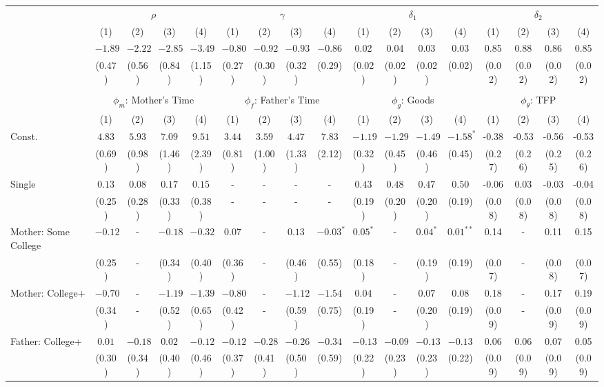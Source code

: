\begin{tabular}{lcccccccccccccccc}\\\toprule
 & \multicolumn{4}{c}{$\rho$} & \multicolumn{4}{c}{$\gamma$} & \multicolumn{4}{c}{$\delta_{1}$} & \multicolumn{4}{c}{$\delta_{2}$} \\
&(1)&(2)&(3)&(4)&(1)&(2)&(3)&(4)&(1)&(2)&(3)&(4)&(1)&(2)&(3)&(4)\\\cmidrule(r){2-5}\cmidrule(r){6-9}\cmidrule(r){10-13}\cmidrule(r){14-17}
&$-1.89$&$-2.22$&$-2.85$&$-3.49$&$-0.80$&$-0.92$&$-0.93$&$-0.86$&0.02&0.04&0.03&0.03&0.85&0.88&0.86&0.85\\
&(0.47)&(0.56)&(0.84)&(1.15)&(0.27)&(0.30)&(0.32)&(0.29)&(0.02)&(0.02)&(0.02)&(0.02)&(0.02)&(0.02)&(0.02)&(0.02)\\
&&&&&&&&&&&&&&&&\\
 & \multicolumn{4}{c}{$\phi_{m}$: Mother's Time} & \multicolumn{4}{c}{$\phi_{f}$: Father's Time} & \multicolumn{4}{c}{$\phi_{g}$: Goods} & \multicolumn{4}{c}{$\phi_{\theta}$: TFP} \\
&(1)&(2)&(3)&(4)&(1)&(2)&(3)&(4)&(1)&(2)&(3)&(4)&(1)&(2)&(3)&(4)\\\cmidrule(r){2-5}\cmidrule(r){6-9}\cmidrule(r){10-13}\cmidrule(r){14-17}
Const.&$4.83$&$5.93$&$7.09$&$9.51$&$3.44$&$3.59$&$4.47$&$7.83$&$-1.19$&$-1.29$&$-1.49$&$-1.58^{*}$&-0.38&-0.53&-0.56&-0.53\\
&(0.69)&(0.98)&(1.46)&(2.39)&(0.81)&(1.00)&(1.33)&(2.12)&(0.32)&(0.45)&(0.46)&(0.45)&(0.27)&(0.26)&(0.25)&(0.26)\\
Single&$0.13$&$0.08$&$0.17$&$0.15$&-&-&-&-&$0.43$&$0.48$&$0.47$&$0.50$&-0.06&0.03&-0.03&-0.04\\
&(0.25)&(0.28)&(0.33)&(0.38)&-&-&-&-&(0.19)&(0.20)&(0.20)&(0.19)&(0.08)&(0.08)&(0.08)&(0.08)\\
Mother: Some College&$-0.12$&-&$-0.18$&$-0.32$&$0.07$&-&$0.13$&$-0.03^{*}$&$0.05^{*}$&-&$0.04^{*}$&$0.01^{**}$&0.14&-&0.11&0.15\\
&(0.25)&-&(0.34)&(0.40)&(0.36)&-&(0.46)&(0.55)&(0.18)&-&(0.19)&(0.19)&(0.07)&-&(0.08)&(0.07)\\
Mother: College+&$-0.70$&-&$-1.19$&$-1.39$&$-0.80$&-&$-1.12$&$-1.54$&$0.04$&-&$0.07$&$0.08$&0.18&-&0.17&0.19\\
&(0.34)&-&(0.52)&(0.65)&(0.42)&-&(0.59)&(0.75)&(0.19)&-&(0.20)&(0.19)&(0.09)&-&(0.09)&(0.09)\\
Father: College+&$0.01$&$-0.18$&$0.02$&$-0.12$&$-0.12$&$-0.28$&$-0.26$&$-0.34$&$-0.13$&$-0.09$&$-0.13$&$-0.13$&0.06&0.06&0.07&0.05\\
&(0.30)&(0.34)&(0.40)&(0.46)&(0.37)&(0.41)&(0.50)&(0.59)&(0.22)&(0.23)&(0.23)&(0.22)&(0.09)&(0.09)&(0.09)&(0.09)\\

\end{tabular}
